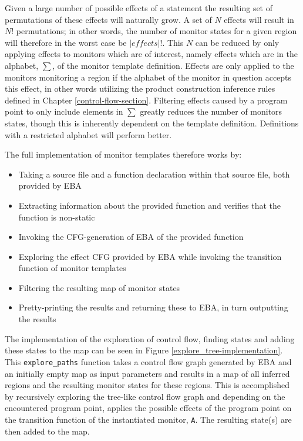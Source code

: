 \newpar Given a large number of possible effects of a statement the resulting set of permutations of these effects will naturally grow. A set of $N$ effects will result in $N!$ permutations; in other words, the number of monitor states for a given region will therefore in the worst case be $|\mathit{effects}|!$. This $N$ can be reduced by only applying effects to monitors which are of interest, namely effects which are in the alphabet, $\sum$, of the monitor template definition. Effects are only applied to the monitors monitoring a region if the alphabet of the monitor in question accepts this effect, in other words utilizing the product construction inference rules defined in Chapter \ref{control-flow-section}.  Filtering effects caused by a program point to only include elements in $\sum$ greatly reduces the number of monitors states, though this is inherently dependent on the template definition. Definitions with a restricted alphabet will perform better. 

The full implementation of monitor templates therefore works by:

\begin{itemize}
    \item Taking a source file and a function declaration within that source file, both provided by EBA
    \item Extracting information about the provided function and verifies that the function is non-static
    \item Invoking the CFG-generation of EBA of the provided function
    \item Exploring the effect CFG provided by EBA while invoking the transition function of monitor templates
    \item Filtering the resulting map of monitor states
    \item Pretty-printing the results and returning these to EBA, in turn outputting the results 
\end{itemize}

\newpar The implementation of the exploration of control flow, finding states and adding these states to the map can be seen in Figure \ref{explore_tree-implementation}. This \texttt{explore\_paths} function takes a control flow graph generated by EBA and an initially empty map as input parameters and results in a map of all inferred regions and the resulting monitor states for these regions. This is accomplished by recursively exploring the tree-like control flow graph and depending on the encountered program point, applies the possible effects of the program point on the transition function of the instantiated monitor, \texttt{A}. The resulting state(s) are then added to the map. 

